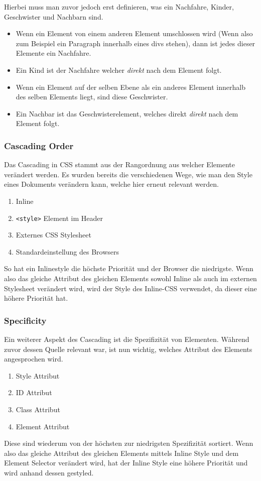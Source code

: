 \documentclass{article}
\begin{document}
	Hierbei muss man zuvor jedoch erst definieren, was ein Nachfahre, Kinder, Geschwister und Nachbarn sind.
	\begin{itemize}
		\item{Wenn ein Element von einem anderen Element umschlossen wird (Wenn also zum Beispiel ein Paragraph innerhalb eines divs stehen), dann ist jedes dieser Elemente ein Nachfahre.}
		\item{Ein Kind ist der Nachfahre welcher \textit{direkt} nach dem Element folgt.}
		\item{Wenn ein Element auf der selben Ebene als ein anderes Element innerhalb des selben Elements liegt, sind diese Geschwister.}
		\item{Ein Nachbar ist das Geschwisterelement, welches direkt \textit{direkt} nach dem Element folgt.}
	\end{itemize}
	\subsubsection{Cascading Order}
	Das Cascading in CSS stammt aus der Rangordnung aus welcher Elemente verändert werden. Es wurden bereits die verschiedenen Wege, wie man den Style eines Dokuments verändern kann, welche hier erneut relevant werden.
	\begin{enumerate}
		\item{Inline}
		\item{\texttt{<style>} Element im Header}
		\item{Externes CSS Stylesheet}
		\item{Standardeinstellung des Browsers}
	\end{enumerate}
	So hat ein Inlinestyle die höchste Priorität und der Browser die niedrigste. Wenn also das gleiche Attribut des gleichen Elements sowohl Inline als auch im externen Stylesheet verändert wird, wird der Style des Inline-CSS verwendet, da dieser eine höhere Priorität hat.
	\subsubsection{Specificity}
	Ein weiterer Aspekt des Cascading ist die Spezifizität von Elementen. Während zuvor dessen Quelle relevant war, ist nun wichtig, welches Attribut des Elements angesprochen wird.
	\begin{enumerate}
		\item{Style Attribut}
		\item{ID Attribut}
		\item{Class Attribut}
		\item{Element Attribut}
	\end{enumerate}
	Diese sind wiederum von der höchsten zur niedrigsten Spezifizität sortiert. Wenn also das gleiche Attribut des gleichen Elements mittels Inline Style und dem Element Selector verändert wird, hat der Inline Style eine höhere Priorität und wird anhand dessen gestyled.
\end{document}
